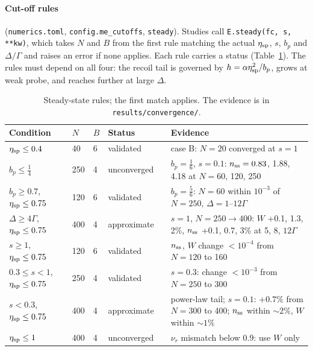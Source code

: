 \documentclass[11pt,a4paper]{article}
\newcommand{\code}[1]{\texttt{#1}}
\begin{document}
\paragraph{Cut-off rules} (\code{numerics.toml}, \code{config.me\_cutoffs}, \code{steady}). Studies call \code{E.steady(fc, s, **kw)}, which takes $N$ and $B$ from the first rule matching the actual $\eta_{\rm sp}$, $s$, $b_p$ and $\Delta/\Gamma$ and raises an error if none applies. Each rule carries a status (Table~\ref{tab:rules}). The rules must depend on all four: the recoil tail is governed by $h=\alpha\eta_{\rm sp}^2/b_p$, grows at weak probe, and reaches further at large $\Delta$.

\begin{table}[h]
\centering\small
\caption{Steady-state rules; the first match applies. The evidence is in \code{results/convergence/}.}
\label{tab:rules}
\begin{tabularx}{\textwidth}{@{}lllllX@{}}
\toprule
Condition & $N$ & $B$ & Status & & Evidence\\
\midrule
$\eta_{\rm sp}\le0.4$ & 40 & 6 & validated & & case B: $N=20$ converged at $s=1$\\
$b_p\le\tfrac14$ & 250 & 4 & unconverged & & $b_p=\tfrac16$, $s=0.1$: $n_{\rm ss}=0.83$, 1.88, 4.18 at $N=60$, 120, 250\\
$b_p\ge0.7$, $\eta_{\rm sp}\le0.75$ & 120 & 6 & validated & & $b_p=\tfrac56$: $N=60$ within $10^{-3}$ of $N=250$, $\Delta=1$--$12\Gamma$\\
$\Delta\ge4\Gamma$, $\eta_{\rm sp}\le0.75$ & 400 & 4 & approximate & & $s=1$, $N=250\to400$: $W$ +0.1, 1.3, 2\%, $n_{\rm ss}$ +0.1, 0.7, 3\% at 5, 8, $12\Gamma$\\
$s\ge1$, $\eta_{\rm sp}\le0.75$ & 120 & 6 & validated & & $n_{\rm ss}$, $W$ change $<10^{-4}$ from $N=120$ to 160\\
$0.3\le s<1$, $\eta_{\rm sp}\le0.75$ & 250 & 4 & validated & & $s=0.3$: change $<10^{-3}$ from $N=250$ to 300\\
$s<0.3$, $\eta_{\rm sp}\le0.75$ & 400 & 4 & approximate & & power-law tail; $s=0.1$: $+0.7\%$ from $N=300$ to 400; $n_{\rm ss}$ within $\sim2\%$, $W$ within $\sim1\%$\\
$\eta_{\rm sp}\le1$ & 400 & 4 & unconverged & & $\nu_r$ mismatch below $0.9$: use $W$ only\\
\bottomrule
\end{tabularx}
\end{table}
\end{document}
